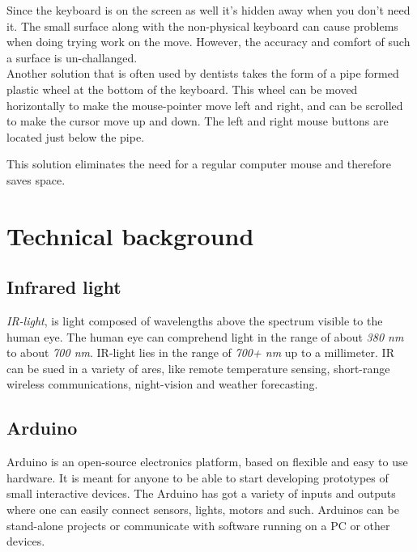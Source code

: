 Since the keyboard is on the screen as well it's hidden away when you don't need it.
The small surface along with the non-physical keyboard can cause problems when doing
trying work on the move. However, the accuracy and comfort of such a surface is un-challanged.\\
Another solution that is often used by dentists takes the form of a pipe formed plastic wheel
at the bottom of the keyboard. This wheel can be moved horizontally to make the mouse-pointer move
left and right, and can be scrolled to make the cursor move up and down. The left and right mouse
buttons are located just below the pipe.

This solution eliminates the need for a regular computer mouse and therefore saves space.\\

\section{Technical background}

\subsection{Infrared light}

\emph{IR-light}, is light composed of wavelengths above the spectrum visible to
the human eye. The human eye can comprehend light in the range of about \emph{380 nm} to about
\emph{700 nm}. IR-light lies in the range of \emph{700+ nm} up to a millimeter.
IR can be sued in a variety of ares, like remote temperature sensing, short-range wireless
communications, night-vision and weather forecasting.

\subsection{Arduino}
Arduino is an open-source electronics platform, based on flexible and easy to use hardware.
It is meant for anyone to be able to start developing prototypes of small interactive devices.
The Arduino has got a variety of inputs and outputs where one can easily connect sensors, 
lights, motors and such. Arduinos can be stand-alone projects or communicate with 
software running on a PC or other devices.

